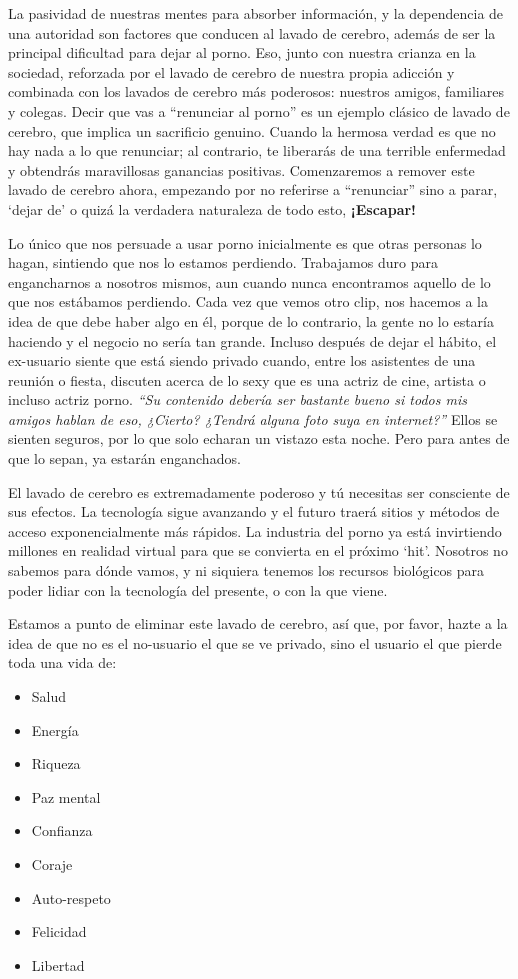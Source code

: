 \documentclass[
  spanish,
  openany]{book}
\providecommand{\tightlist}{%
  \setlength{\itemsep}{0pt}\setlength{\parskip}{0pt}}
\begin{document}
La pasividad de nuestras mentes para absorber información, y la dependencia de una autoridad son factores que conducen al lavado de cerebro, además de ser la principal dificultad para dejar al porno. Eso, junto con nuestra crianza en la sociedad, reforzada por el lavado de cerebro de nuestra propia adicción y combinada con los lavados de cerebro más poderosos: nuestros amigos, familiares y colegas. Decir que vas a ``renunciar al porno'' es un ejemplo clásico de lavado de cerebro, que implica un sacrificio genuino. Cuando la hermosa verdad es que no hay nada a lo que renunciar; al contrario, te liberarás de una terrible enfermedad y obtendrás maravillosas ganancias positivas. Comenzaremos a remover este lavado de cerebro ahora, empezando por no referirse a ``renunciar'' sino a parar, `dejar de' o quizá la verdadera naturaleza de todo esto, \textbf{¡Escapar!}

Lo único que nos persuade a usar porno inicialmente es que otras personas lo hagan, sintiendo que nos lo estamos perdiendo. Trabajamos duro para engancharnos a nosotros mismos, aun cuando nunca encontramos aquello de lo que nos estábamos perdiendo. Cada vez que vemos otro clip, nos hacemos a la idea de que debe haber algo en él, porque de lo contrario, la gente no lo estaría haciendo y el negocio no sería tan grande. Incluso después de dejar el hábito, el ex-usuario siente que está siendo privado cuando, entre los asistentes de una reunión o fiesta, discuten acerca de lo sexy que es una actriz de cine, artista o incluso actriz porno. \emph{``Su contenido debería ser bastante bueno si todos mis amigos hablan de eso, ¿Cierto? ¿Tendrá alguna foto suya en internet?''} Ellos se sienten seguros, por lo que solo echaran un vistazo esta noche. Pero para antes de que lo sepan, ya estarán enganchados.

El lavado de cerebro es extremadamente poderoso y tú necesitas ser consciente de sus efectos. La tecnología sigue avanzando y el futuro traerá sitios y métodos de acceso exponencialmente más rápidos. La industria del porno ya está invirtiendo millones en realidad virtual para que se convierta en el próximo `hit'. Nosotros no sabemos para dónde vamos, y ni siquiera tenemos los recursos biológicos para poder lidiar con la tecnología del presente, o con la que viene.

Estamos a punto de eliminar este lavado de cerebro, así que, por favor, hazte a la idea de que no es el no-usuario el que se ve privado, sino el usuario el que pierde toda una vida de:

\begin{itemize}
\tightlist
\item
  Salud
\item
  Energía
\item
  Riqueza
\item
  Paz mental
\item
  Confianza
\item
  Coraje
\item
  Auto-respeto
\item
  Felicidad
\item
  Libertad
\end{itemize}
\end{document}
